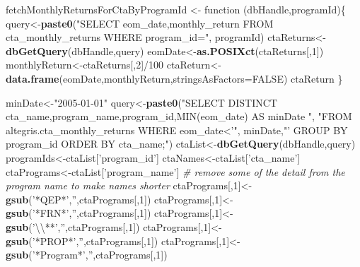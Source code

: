 \documentclass[]{article}
\newenvironment{Shaded}{\begin{snugshade}}{\end{snugshade}}
\newcommand{\KeywordTok}[1]{\textcolor[rgb]{0.13,0.29,0.53}{\textbf{{#1}}}}
\newcommand{\DataTypeTok}[1]{\textcolor[rgb]{0.13,0.29,0.53}{{#1}}}
\newcommand{\DecValTok}[1]{\textcolor[rgb]{0.00,0.00,0.81}{{#1}}}
\newcommand{\CharTok}[1]{\textcolor[rgb]{0.31,0.60,0.02}{{#1}}}
\newcommand{\StringTok}[1]{\textcolor[rgb]{0.31,0.60,0.02}{{#1}}}
\newcommand{\CommentTok}[1]{\textcolor[rgb]{0.56,0.35,0.01}{\textit{{#1}}}}
\newcommand{\OtherTok}[1]{\textcolor[rgb]{0.56,0.35,0.01}{{#1}}}
\newcommand{\NormalTok}[1]{{#1}}
\begin{document}
\begin{Shaded}
\begin{Highlighting}[]
\NormalTok{fetchMonthlyReturnsForCtaByProgramId <-}\StringTok{ }\NormalTok{function (dbHandle,programId)\{}
  \NormalTok{query<-}\KeywordTok{paste0}\NormalTok{(}\StringTok{"SELECT eom_date,monthly_return FROM cta_monthly_returns WHERE program_id="}\NormalTok{,}
    \NormalTok{programId)}
  \NormalTok{ctaReturns<-}\KeywordTok{dbGetQuery}\NormalTok{(dbHandle,query)}
  \NormalTok{eomDate<-}\KeywordTok{as.POSIXct}\NormalTok{(ctaReturns[,}\DecValTok{1}\NormalTok{])}
  \NormalTok{monthlyReturn<-ctaReturns[,}\DecValTok{2}\NormalTok{]/}\DecValTok{100}
  \NormalTok{ctaReturn<-}\KeywordTok{data.frame}\NormalTok{(eomDate,monthlyReturn,}\DataTypeTok{stringsAsFactors=}\OtherTok{FALSE}\NormalTok{)}
  \NormalTok{ctaReturn}
  \NormalTok{\}}
\end{Highlighting}
\end{Shaded}

\begin{Shaded}
\begin{Highlighting}[]
\NormalTok{minDate<-}\StringTok{"2005-01-01"}
\NormalTok{query<-}\KeywordTok{paste0}\NormalTok{(}\StringTok{"SELECT DISTINCT cta_name,program_name,program_id,MIN(eom_date) AS minDate "}\NormalTok{,}
  \StringTok{"FROM altegris.cta_monthly_returns WHERE eom_date<'"}\NormalTok{,}
  \NormalTok{minDate,}\StringTok{"' GROUP BY program_id ORDER BY cta_name;"}\NormalTok{)}
\NormalTok{ctaList<-}\KeywordTok{dbGetQuery}\NormalTok{(dbHandle,query)}
\NormalTok{programIds<-ctaList[}\StringTok{'program_id'}\NormalTok{]}
\NormalTok{ctaNames<-ctaList[}\StringTok{'cta_name'}\NormalTok{]}
\NormalTok{ctaPrograms<-ctaList[}\StringTok{'program_name'}\NormalTok{]}
\CommentTok{# remove some of the detail from the program name to make names shorter}
\NormalTok{ctaPrograms[,}\DecValTok{1}\NormalTok{]<-}\KeywordTok{gsub}\NormalTok{(}\StringTok{'*QEP*'}\NormalTok{,}\StringTok{''}\NormalTok{,ctaPrograms[,}\DecValTok{1}\NormalTok{])}
\NormalTok{ctaPrograms[,}\DecValTok{1}\NormalTok{]<-}\KeywordTok{gsub}\NormalTok{(}\StringTok{'*FRN*'}\NormalTok{,}\StringTok{''}\NormalTok{,ctaPrograms[,}\DecValTok{1}\NormalTok{])}
\NormalTok{ctaPrograms[,}\DecValTok{1}\NormalTok{]<-}\KeywordTok{gsub}\NormalTok{(}\StringTok{'}\CharTok{\textbackslash{}\textbackslash{}}\StringTok{**'}\NormalTok{,}\StringTok{''}\NormalTok{,ctaPrograms[,}\DecValTok{1}\NormalTok{])}
\NormalTok{ctaPrograms[,}\DecValTok{1}\NormalTok{]<-}\KeywordTok{gsub}\NormalTok{(}\StringTok{'*PROP*'}\NormalTok{,}\StringTok{''}\NormalTok{,ctaPrograms[,}\DecValTok{1}\NormalTok{])}
\NormalTok{ctaPrograms[,}\DecValTok{1}\NormalTok{]<-}\KeywordTok{gsub}\NormalTok{(}\StringTok{'*Program*'}\NormalTok{,}\StringTok{''}\NormalTok{,ctaPrograms[,}\DecValTok{1}\NormalTok{])}
\end{Highlighting}
\end{Shaded}
\end{document}

